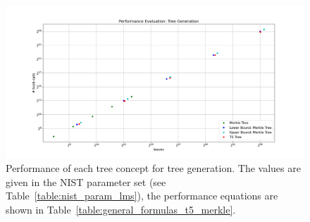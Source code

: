 \begin{figure}
\centering
\includegraphics[width=\linewidth]{images/Evaluation/performance_tree_generation.png}
\caption{Performance of each tree concept for tree generation. The values are given in the NIST parameter set (see Table~\ref{table:nist_param_lms}), the performance equations are shown in Table~\ref{table:general_formulas_t5_merkle}.}
\label{img:performance_tree_gen}
\end{figure}


